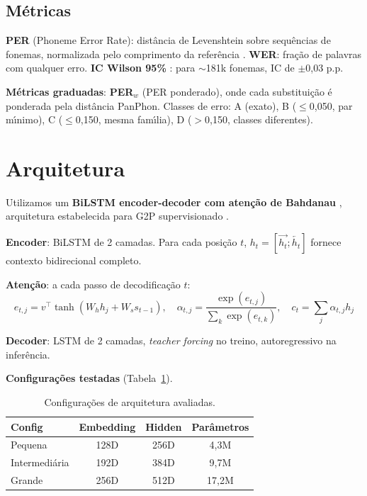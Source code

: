 \documentclass[12pt]{article}
\begin{document}
\subsection{M\'etricas}

\textbf{PER} (Phoneme Error Rate): dist\^ancia de Levenshtein sobre
sequ\^encias de fonemas, normalizada pelo comprimento da refer\^encia
\cite{morris2004cer,bisani2008joint}. \textbf{WER}: fra\c{c}\~ao de
palavras com qualquer erro. \textbf{IC Wilson 95\%}
\cite{wilson1927probable,brown2001interval}: para ${\sim}$181k fonemas,
IC de $\pm$0,03 p.p.

\textbf{M\'etricas graduadas}: \textbf{PER$_w$} (PER ponderado), onde
cada substitui\c{c}\~ao \'e ponderada pela dist\^ancia PanPhon. Classes
de erro: A (exato), B ($\leq$0,050, par m\'{\i}nimo), C ($\leq$0,150,
mesma fam\'{\i}lia), D ($>$0,150, classes diferentes).

\section{Arquitetura}

Utilizamos um \textbf{BiLSTM encoder-decoder com aten\c{c}\~ao de
Bahdanau} \cite{bahdanau2014neural}, arquitetura estabelecida para G2P
supervisionado \cite{rao2015g2p}.

\textbf{Encoder}: BiLSTM de 2 camadas. Para cada posi\c{c}\~ao $t$,
$h_t = [\overrightarrow{h_t}; \overleftarrow{h_t}]$ fornece contexto
bidirecional completo.

\textbf{Aten\c{c}\~ao}: a cada passo de decodifica\c{c}\~ao $t$:
\begin{equation}
e_{t,j} = v^\top \tanh(W_h h_j + W_s s_{t-1}), \quad
\alpha_{t,j} = \frac{\exp(e_{t,j})}{\sum_k \exp(e_{t,k})}, \quad
c_t = \sum_j \alpha_{t,j} h_j
\end{equation}

\textbf{Decoder}: LSTM de 2 camadas, \emph{teacher forcing} no treino,
autoregressivo na infer\^encia.

\textbf{Configura\c{c}\~oes testadas} (Tabela~\ref{tab:configs}).

\begin{table}[ht]
\centering
\caption{Configura\c{c}\~oes de arquitetura avaliadas.}
\label{tab:configs}
\begin{tabular}{lccc}
\toprule
\textbf{Config} & \textbf{Embedding} & \textbf{Hidden} & \textbf{Par\^ametros} \\
\midrule
Pequena       & 128D & 256D & 4,3M \\
Intermedi\'aria & 192D & 384D & 9,7M \\
Grande        & 256D & 512D & 17,2M \\
\bottomrule
\end{tabular}
\end{table}
\end{document}
